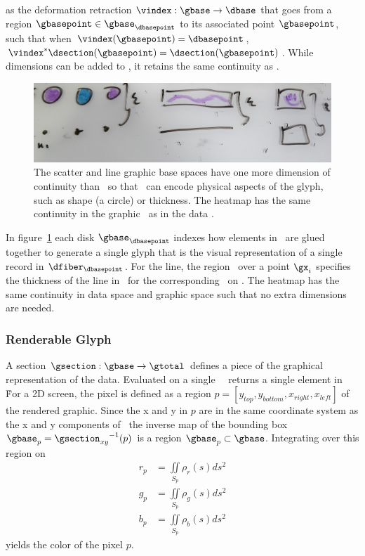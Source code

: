 \documentclass[../main.tex]{subfiles}
\begin{document}
 as the deformation retraction \cite{RetractionTopology2020} $\vindex: \gbase \rightarrow \dbase$ that goes from a region $\gbasepoint \in \gbase_{\dbasepoint}$ to its associated point $\gbasepoint$, such that when $\vindex(\gbasepoint) = \dbasepoint$,\, $\vindex^*\dsection(\gbasepoint) = \dsection(\gbasepoint)$. While dimensions can be added to \gbase, it retains the same continuity as \dbase.
 
\begin{figure}
    \includegraphics[width=1\textwidth]{figures/math/retraction_maps.png}
    \caption{The scatter and line graphic base spaces have one more dimension of continuity than \dbase\ so that \gbase\ can encode physical aspects of the glyph, such as shape (a circle) or thickness. The heatmap has the same continuity in the graphic \gbase\ as in the data \dbase. }
    \label{fig:graphic_retraction_map}
\end{figure}

In figure~\ref{fig:graphic_retraction_map} each disk $\gbase_{\dbasepoint}$ indexes how elements in \gfiber\ are glued together to generate a single glyph that is the visual representation of a single record in $\dfiber_{\dbasepoint}$. For the line, the region \gy\ over a point $\gx_i$ specifies the thickness of the line in \gbase\ for the corresponding \dsection\ on \dbase. The heatmap has the same continuity in data space and graphic space such that no extra dimensions are needed. 

 
\subsubsection{Renderable Glyph \gsection}
\label{sec:graphic_section}
A section $\gsection: \gbase\rightarrow \gtotal$ defines a piece of the graphical representation of the data. Evaluated on a single \gbasepoint\, \gsection\ returns a single element in \gfiber\. For a 2D screen, the pixel is defined as a region $p=\left[y_{top}, y_{bottom}, x_{right}, x_{left}\right]$ of the rendered graphic. Since the x and y in $p$ are in the same coordinate system as the x and y components of \gfiber\,  the inverse map of the bounding box $\gbase_{p} ={\gsection_{xy}}^{-1}(p)$ is a region $\gbase_p \subset \gbase$. Integrating over this region on \gbase\
\begin{align}
    r_p &= \iint\limits_{S_p} \rho_r(s)ds^{2}\\
    g_p &= \iint\limits_{S_p} \rho_g(s)ds^{2}\\
    b_p &= \iint\limits_{S_p} \rho_b(s)ds^{2}
\end{align}
yields the color of the pixel $p$.
\end{document}
